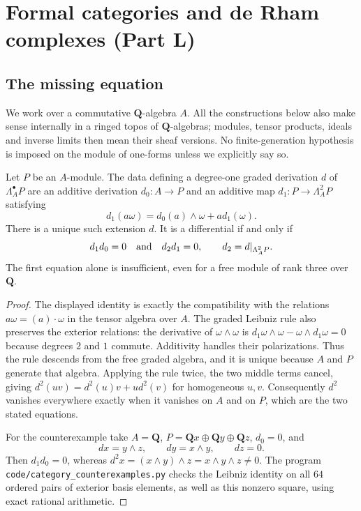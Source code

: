 \section{Formal categories and de Rham complexes (Part L)}\label{sec:categoryL}

\subsection{The missing equation}
We work over a commutative $\mathbf Q$-algebra $A$.  All the constructions
below also make sense internally in a ringed topos of $\mathbf Q$-algebras;
modules, tensor products, ideals and inverse limits then mean their sheaf
versions.  No finite-generation hypothesis is imposed on the module of
one-forms unless we explicitly say so.

\begin{proposition}\label{cat:L1}
Let $P$ be an $A$-module.  The data defining a degree-one graded derivation
$d$ of $\Lambda_A^\bullet P$ are an additive derivation
$d_0:A\to P$ and an additive map $d_1:P\to\Lambda_A^2P$ satisfying
\[
 d_1(a\omega)=d_0(a)\wedge\omega+a d_1(\omega).
\]
There is a unique such extension $d$.  It is a differential if and only if
\[
 d_1d_0=0\quad\hbox{and}\quad d_2d_1=0,
 \qquad d_2=d|_{\Lambda_A^2P}.
\]
The first equation alone is insufficient, even for a free module of rank
three over $\mathbf Q$.
\end{proposition}
\begin{proof}
The displayed identity is exactly the compatibility with the relations
$a\omega=(a)\cdot\omega$ in the tensor algebra over $A$.  The graded
Leibniz rule also preserves the exterior relations: the derivative of
$\omega\wedge\omega$ is
$d_1\omega\wedge\omega-\omega\wedge d_1\omega=0$ because degrees
$2$ and $1$ commute.  Additivity handles their polarizations.  Thus the
rule descends from the free graded algebra, and it is unique because $A$
and $P$ generate that algebra.  Applying the rule twice, the two middle
terms cancel, giving
$d^2(uv)=d^2(u)v+u d^2(v)$ for homogeneous $u,v$.
Consequently $d^2$ vanishes everywhere exactly when it vanishes on $A$
and on $P$, which are the two stated equations.

For the counterexample take $A=\mathbf Q$,
$P=\mathbf Qx\oplus\mathbf Qy\oplus\mathbf Qz$, $d_0=0$, and
\[
 dx=y\wedge z,\qquad dy=x\wedge y,\qquad dz=0.
\]
Then $d_1d_0=0$, whereas
$d^2x=(x\wedge y)\wedge z=x\wedge y\wedge z\ne0$.
The program \texttt{code/category\_counterexamples.py} checks the
Leibniz identity on all $64$ ordered pairs of exterior basis elements,
as well as this nonzero square, using exact rational arithmetic.
\end{proof}

